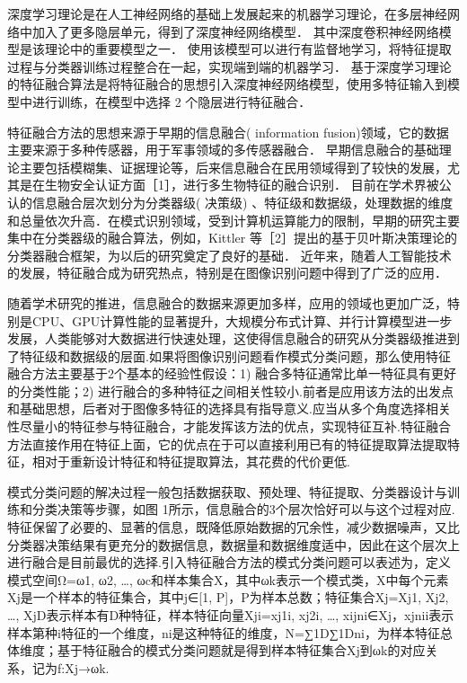 深度学习理论是在人工神经网络的基础上发展起来的机器学习理论，在多层神经网络中加入了更多隐层单元，得到了深度神经网络模型． 其中深度卷积神经网络模型是该理论中的重要模型之一． 使用该模型可以进行有监督地学习，将特征提取过程与分类器训练过程整合在一起，实现端到端的机器学习． 基于深度学习理论的特征融合算法是将特征融合的思想引入深度神经网络模型，使用多特征输入到模型中进行训练，在模型中选择 2 个隐层进行特征融合．


特征融合方法的思想来源于早期的信息融合( information fusion)领域，它的数据主要来源于多种传感器，用于军事领域的多传感器融合． 早期信息融合的基础理论主要包括模糊集、证据理论等，后来信息融合在民用领域得到了较快的发展，尤其是在生物安全认证方面［1］，进行多生物特征的融合识别． 目前在学术界被公认的信息融合层次划分为分类器级( 决策级) 、特征级和数据级，处理数据的维度和总量依次升高．在模式识别领域，受到计算机运算能力的限制，早期的研究主要集中在分类器级的融合算法，例如，Kittler
等［2］提出的基于贝叶斯决策理论的分类器融合框架，为以后的研究奠定了良好的基础． 近年来，随着人工智能技术的发展，特征融合成为研究热点，特别是在图像识别问题中得到了广泛的应用．

随着学术研究的推进，信息融合的数据来源更加多样，应用的领域也更加广泛，特别是CPU、GPU计算性能的显著提升，大规模分布式计算、并行计算模型进一步发展，人类能够对大数据进行快速处理，这使得信息融合的研究从分类器级推进到了特征级和数据级的层面.如果将图像识别问题看作模式分类问题，那么使用特征融合方法主要基于2个基本的经验性假设：1) 融合多特征通常比单一特征具有更好的分类性能；2) 进行融合的多种特征之间相关性较小.前者是应用该方法的出发点和基础思想，后者对于图像多特征的选择具有指导意义.应当从多个角度选择相关性尽量小的特征参与特征融合，才能发挥该方法的优点，实现特征互补.特征融合方法直接作用在特征上面，它的优点在于可以直接利用已有的特征提取算法提取特征，相对于重新设计特征和特征提取算法，其花费的代价更低.

模式分类问题的解决过程一般包括数据获取、预处理、特征提取、分类器设计与训练和分类决策等步骤，如图 1所示，信息融合的3个层次恰好可以与这个过程对应.特征保留了必要的、显著的信息，既降低原始数据的冗余性，减少数据噪声，又比分类器决策结果有更充分的数据信息，数据量和数据维度适中，因此在这个层次上进行融合是目前最优的选择.引入特征融合方法的模式分类问题可以表述为，定义模式空间Ω={ω1, ω2, …, ωc}和样本集合X，其中ωk表示一个模式类，X中每个元素Xj是一个样本的特征集合，其中j∈[1, P]，P为样本总数；特征集合Xj={Xj1, Xj2, …, XjD}表示样本有D种特征，样本特征向量Xji={xj1i, xj2i, …, xijni}∈Xj，xjnii表示样本第种i特征的一个维度，ni是这种特征的维度，N=∑1D∑1Dni，为样本特征总体维度；基于特征融合的模式分类问题就是得到样本特征集合Xj到ωk的对应关系，记为f:Xj→ωk.




